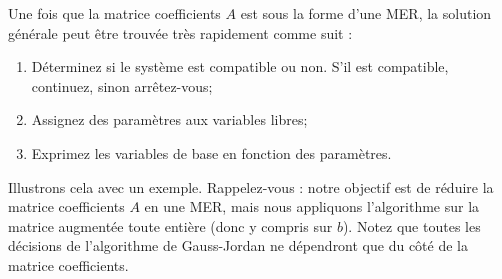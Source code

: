 Une fois que la matrice coefficients $A$ est sous la forme d'une MER, la solution générale peut être trouvée très rapidement comme suit :
\begin{enumerate}
\item Déterminez si le système est compatible ou non.  S'il est compatible, continuez, sinon arrêtez-vous;
\item Assignez des paramètres aux variables libres;
\item Exprimez les variables de base en fonction des paramètres.\\
\end{enumerate}

Illustrons cela avec un exemple. Rappelez-vous : notre objectif est de r\'eduire la matrice coefficients $A$ en une MER, mais nous appliquons l'algorithme sur  la matrice augmentée toute entière (donc y compris sur $b$). Notez que toutes les décisions de l'algorithme de Gauss-Jordan ne dépendront que du côté de la matrice coefficients. 

